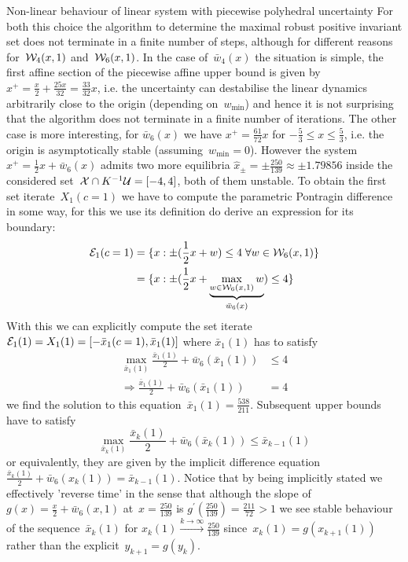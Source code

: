 \begin{example}{Non-linear behaviour of linear system with piecewise polyhedral uncertainty}
%
For both this choice the algorithm to determine the maximal robust positive invariant set does not terminate in a finite number of steps, although for different reasons for~$\mathcal W_4(x,1)$ and~$\mathcal W_6(x,1)$.
%
In the case of~$\bar w_4(x)$ the situation is simple, the first affine section of the piecewise affine upper bound is given by~$x^+ = \frac{x}{2}+\frac{25x}{32} = \frac{33}{32}x$, i.e. the uncertainty can destabilise the linear dynamics arbitrarily close to the origin (depending on~$w_{\min}$) and hence it is not surprising that the algorithm does not terminate in a finite number of iterations.
%
The other case is more interesting, for $\bar w_6(x)$ we have $x^+=\frac{61}{72}x$ for $-\frac{5}{3}\leq x\leq \frac{5}{3}$, i.e. the origin is asymptotically stable (assuming~$w_{\min}=0$).
%
However the system~$x^+=\frac{1}{2}x+\bar w_6(x)$ admits two more equilibria $\hat x_{\pm}=\pm\frac{250}{139}\approx\pm1.79856$ inside the considered set~$\mathcal X\cap K^{-1}\mathcal U=[-4,4]$, both of them unstable.
%
To obtain the first set iterate~$X_1(c=1)$ we have to compute the parametric Pontragin difference in some way, for this we use its definition do derive an expression for its boundary:
%
\[\begin{aligned}
\mathcal E_1(c=1) &= \{x:\pm(\frac{1}{2}x+w)\leq4\;\forall w\in\mathcal W_6(x,1)\}\\
&= \{x:\pm(\frac{1}{2}x + \underbrace{\max_{w\in\mathcal W_6(x,1)}w}_{\bar w_6(x)})\leq 4\}
\end{aligned}\]
%
With this we can explicitly compute the set iterate~$\mathcal E_1(1) = X_1(1) = [-\bar x_1(c=1),\bar x_1(1)]$ where $\bar x_1(1)$ has to satisfy
%
\[\begin{aligned}
\max_{\bar x_1(1)}\frac{\bar x_1(1)}{2}+\bar w_6(\bar x_1(1)) &\leq 4\\
\Rightarrow \frac{\bar x_1(1)}{2}+\bar w_6(\bar x_1(1)) &= 4
\end{aligned}
\]
%
we find the solution to this equation~$\bar x_1(1)=\frac{538}{211}$.
%
Subsequent upper bounds have to satisfy
%
\[
\max_{\bar x_k(1)}\frac{\bar x_k(1)}{2}+\bar w_6(\bar x_k(1)) \leq \bar x_{k-1}(1)
\] 
%
or equivalently, they are given by the implicit difference equation $\frac{\bar x_k(1)}{2}+\bar w_6(x_k(1)) = \bar x_{k-1}(1)$.
%
Notice that by being implicitly stated we effectively 'reverse time' in the sense that although the slope of $g(x)=\frac{x}{2}+\bar w_6(x,1)$ at~$x=\frac{250}{139}$ is $g^\prime(\frac{250}{139}) = \frac{211}{72}>1$ we see stable behaviour of the sequence~$\bar x_k(1)$ for $x_k(1)\xrightarrow{k\rightarrow\infty}\frac{250}{139}$ since~$x_{k}(1)=g(x_{k+1}(1))$ rather than the explicit~$y_{k+1}=g(y_k)$.

\end{example}
